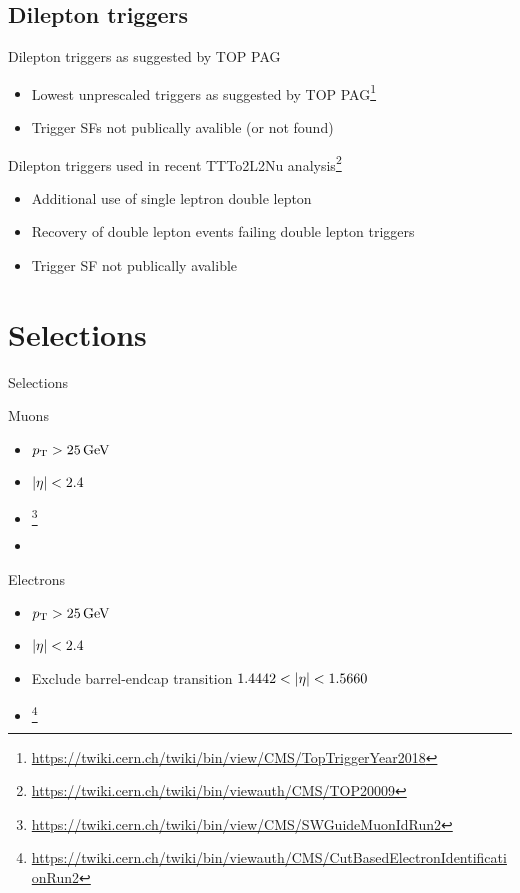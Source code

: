 \documentclass[18pt]{beamer}
\begin{document}
\subsection{Dilepton triggers}
\begin{frame}{Dilepton triggers as suggested by TOP PAG}
	\begin{itemize}
		\item Lowest unprescaled triggers as suggested by TOP PAG\footnote{\url{https://twiki.cern.ch/twiki/bin/view/CMS/TopTriggerYear2018}}
		\item Trigger SFs not publically avalible (or not found)
	\end{itemize}
	
\end{frame}

\begin{frame}{Dilepton triggers used in recent TTTo2L2Nu analysis\footnote{\url{https://twiki.cern.ch/twiki/bin/viewauth/CMS/TOP20009}}}
	\begin{itemize}
		\item Additional use of single leptron double lepton
		\item Recovery of double lepton events failing double lepton triggers
		\item Trigger SF not publically avalible
	\end{itemize}
	
\end{frame}

\section{Selections}
\begin{frame}{Selections}

	\begin{multicols}{2}
		Muons
		\begin{itemize}
			\item $p_{\text{T}}>\SI{25}{\giga\electronvolt}$
			\item $|\eta|<2.4$
			\item {}\footnote{\url{https://twiki.cern.ch/twiki/bin/view/CMS/SWGuideMuonIdRun2}}
			\item {}
		\end{itemize}
		\vfill\null
		\columnbreak
		Electrons
		\begin{itemize}
			\item $p_{\text{T}}>\SI{25}{\giga\electronvolt}$
			\item $|\eta|<2.4$
			\item Exclude barrel-endcap transition $1.4442<\abs{\eta}<1.5660$
			\item {}\footnote{\url{https://twiki.cern.ch/twiki/bin/viewauth/CMS/CutBasedElectronIdentificationRun2}}
		\end{itemize}	
	\end{multicols}

\end{frame}
\end{document}
